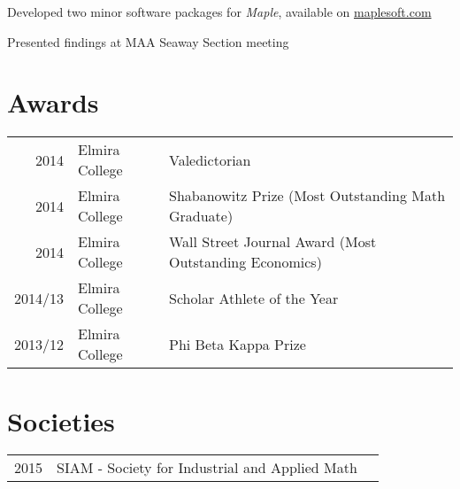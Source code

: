 \documentclass[letterpaper]{pine-resume} %
\begin{document}
\begin{minipage}[t]{0.66\textwidth}


\begin{tightitemize}
\item Developed two minor software packages for \emph{Maple}, available on \href{http://www.maplesoft.com/}{maplesoft.com}
\item Presented findings at MAA Seaway Section meeting
\end{tightitemize}

\sectionspace %


\section{Awards}

\begin{tabular}{rll}
2014	 & Elmira College & Valedictorian \\
2014	 & Elmira College & Shabanowitz Prize (Most Outstanding Math Graduate) \\
2014	 & Elmira College & Wall Street Journal Award (Most Outstanding Economics) \\
2014/13  & Elmira College & Scholar Athlete of the Year \\
2013/12  & Elmira College & Phi Beta Kappa Prize \\
\end{tabular}

\sectionspace %


\section{Societies}

\begin{tabular}{rll}
2015 & SIAM - Society for Industrial and Applied Math \\
\end{tabular}

\sectionspace %


\end{minipage}
\end{document}
